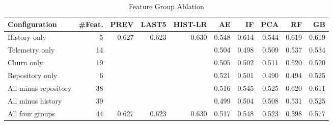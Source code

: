 \begin{table}[htbp]
\centering
\small
\caption{Feature Group Ablation}
\label{tab:ablation}
\begin{tabular}{lrrrrrrrrr}
\toprule
Configuration & \#Feat. & PREV & LAST5 & HIST-LR & AE & IF & PCA & RF & GB \\
\midrule
History only & 5 & 0.627 & 0.623 & 0.630 & 0.548 & 0.614 & 0.544 & 0.619 & 0.619 \\
Telemetry only & 14 &  &  &  & 0.504 & 0.498 & 0.509 & 0.537 & 0.534 \\
Churn only & 19 &  &  &  & 0.505 & 0.502 & 0.511 & 0.520 & 0.520 \\
Repository only & 6 &  &  &  & 0.521 & 0.501 & 0.490 & 0.494 & 0.525 \\
All minus repository & 38 &  &  &  & 0.516 & 0.545 & 0.525 & 0.620 & 0.611 \\
All minus history & 39 &  &  &  & 0.499 & 0.504 & 0.508 & 0.531 & 0.525 \\
All four groups & 44 & 0.627 & 0.623 & 0.630 & 0.517 & 0.548 & 0.523 & 0.598 & 0.577 \\
\bottomrule
\end{tabular}
\end{table}
